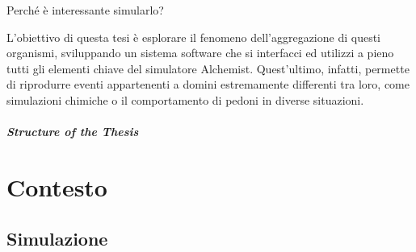 \documentclass[12pt,a4paper,openright,twoside]{book}
\begin{document}
Perché è interessante simularlo?

L'obiettivo di questa tesi è esplorare il fenomeno dell'aggregazione di questi organismi, sviluppando un sistema software che 
si interfacci ed utilizzi a pieno tutti gli elementi chiave del simulatore Alchemist. Quest'ultimo, infatti, permette di riprodurre eventi appartenenti 
a domini estremamente differenti tra loro, come simulazioni chimiche o il comportamento di pedoni in diverse situazioni.


%
%
%

\paragraph{Structure of the Thesis}


\chapter{Contesto}


\section{Simulazione}
\end{document}
